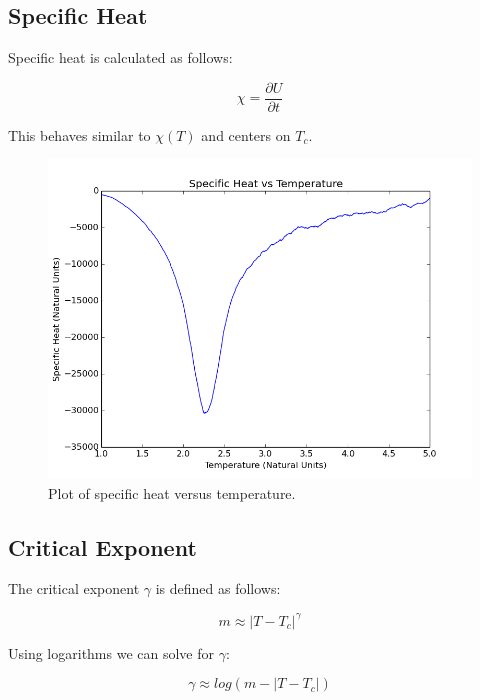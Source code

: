 \documentclass[10pt]{article}
\newcommand{\beq}{\begin{equation}}
\newcommand{\eeq}{\end{equation}}
\newcommand{\n}{\noindent}
\begin{document}
\subsection{Specific Heat}
Specific heat is calculated as follows:

\beq
\label{eqn:equation6}
\chi=\frac{\partial U}{\partial t}
\eeq

This behaves similar to $\chi(T)$ and centers on $T_c$.

\begin{figure}[H]
\centering
\begin{minipage}{.75\textwidth}
\centering
\includegraphics[width= \linewidth]{Specific_Heat_v_Temp.png}
\end{minipage}\hfill
\caption{Plot of specific heat versus temperature.}
\label{fig:figure4}
\end{figure}
\n
\n
\subsection{Critical Exponent}
The critical exponent $\gamma$ is defined as follows:


\beq
\label{eqn:equation7}
m\approx |T-T_c|^{\gamma}
\eeq

Using logarithms we can solve for $\gamma$:

\beq
\label{eqn:equation8}
\gamma \approx log(m-|T-T_c|)
\eeq
\end{document}
